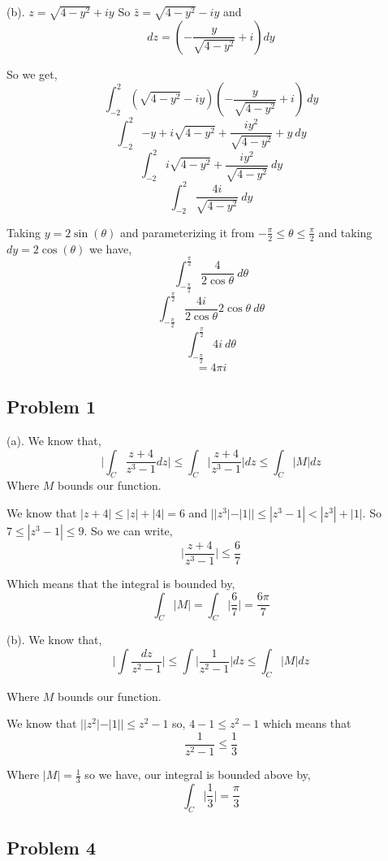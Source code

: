 \documentclass[a4paper]{report}
\begin{document}
(b). $z = \sqrt{4 - y^2} + iy$ So $\bar z = \sqrt{4 - y^2} - iy$ and 
$$ dz = (-\frac{y}{\sqrt{4-y^2}} + i) dy $$ 

So we get, 
$$ \int_{{-2}}^{{2}} {(\sqrt{4 - y^2} - iy)(-\frac{y}{\sqrt{4 - y^2}} +i)} \: d{y} {} $$ 
$$ \int_{{-2}}^{{2}} {-y + i\sqrt{4- y^2} + \frac{iy^2}{\sqrt{4 - y^2}} + y} \: d{y} {} $$ 
$$ \int_{{-2}}^{{2}} { i\sqrt{4- y^2} + \frac{iy^2}{\sqrt{4 - y^2}} } \: d{y} {} $$ 
$$ \int_{{-2}}^{{2}} { \frac{4i}{\sqrt{4 - y^2}} } \: d{y} {} $$ 

Taking $y = 2\sin(\theta)$ and parameterizing it from $-\frac{\pi}{2} \le \theta \le \frac{\pi}{2} $ and taking $dy = 2\cos(\theta)$ we have, 
$$ \int_{{-\frac{\pi}{2}}}^{{\frac{\pi}{2}}} {\frac{4}{2\cos\theta}} \: d{\theta} {} $$ 
$$ \int_{{-\frac{\pi}{2}}}^{{\frac{\pi}{2}}} {\frac{4i}{2\cos\theta} 2\cos \theta } \: d{\theta} {} $$ 
$$ \int_{{-\frac{\pi}{2}}}^{{\frac{\pi}{2}}} {4i} \: d{\theta} {} $$ 
$$ = 4\pi i $$ 


\subsection*{Problem 1}
(a). We know that, 
$$ \bigg | \int_C \frac{z + 4}{z^{3} - 1} dz\bigg | \le \int_C \bigg | \frac{z + 4}{z^{3} - 1}\bigg | dz \le \int_C | M | dz$$ 
Where $M$ bounds our function.

We know that $ |z + 4| \le |z| + |4| = 6$ and  $||z^{3}| - |1|| \le |z^{3} - 1| < |z^{3}| + |1| $. So $7 \le |z^{3} - 1| \le 9$. So we can write, 
$$ \bigg | \frac{z + 4}{z^{3} - 1} \bigg| \le \frac{6}{7} $$ 

Which means that the integral is bounded by, 
$$ \int_C |M| = \int_C \bigg|\frac{6}{7}\bigg|  = \frac{6\pi}{7}$$ 



(b). We know that, 
$$ \bigg | \int \frac{dz}{z^2 - 1} \bigg | \le  \int\bigg | \frac{1}{z^2 - 1} \bigg |dz \le \int_C |M| dz$$ 

Where $M$ bounds our function.

We know that $ ||z^2| - |1||\le z^2 - 1$ so, $4 - 1 \le z^2 - 1$ which means that 
$$ \frac{1}{z^2 - 1} \le \frac{1}{3} $$ 

Where $|M| = \frac{1}{3}$ so we have, our integral is bounded above by, 
$$ \int_C \bigg |\frac{1}{3} \bigg | = \frac{\pi}{3} $$


\subsection*{Problem 4}
\end{document}

